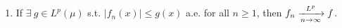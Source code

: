 \documentclass[12pt]{article}
\begin{document}
\begin{enumerate}
\begin{enumerate}
\begin{mybox}
\end{mybox}
\item If $\exists \ g \in L^p(\mu)$ s.t. $|f_n(x)| \leq g(x)$ a.e. for all $n \geq 1$, then $\displaystyle f_n \xrightarrow[n \to \infty]{L^p} f$.
\begin{mybox}

\end{mybox}
\end{enumerate}
\end{enumerate}
\end{document}
